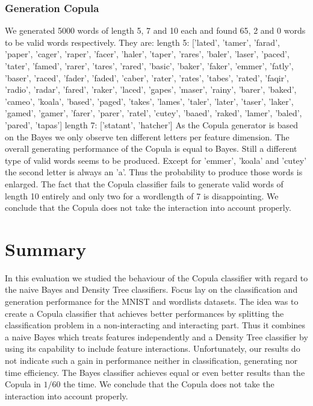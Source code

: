 \documentclass[draft]{article}
\begin{document}
\subsubsection{Generation Copula}
We generated 5000 words of length 5, 7 and 10 each and found 65, 2 and 0 words
to be valid words respectively. They are:
\newline
\newline
length 5: ['lated', 'tamer', 'farad', 'paper', 'cager', 'raper', 'facer', 'haler', 'taper', 'rares', 'baler', 'laser', 'paced', 'tater', 'famed', 'rarer', 'tares', 'rared', 'basic', 'baker', 'faker', 'emmer', 'fatly', 'baser', 'raced', 'fader', 'faded', 'caber', 'rater', 'rates', 'tabes', 'rated', 'faqir', 'radio', 'radar', 'fared', 'raker', 'laced', 'gapes', 'maser', 'rainy', 'barer', 'baked', 'cameo', 'koala', 'based', 'paged', 'takes', 'lames', 'taler', 'later', 'taser', 'laker', 'gamed', 'gamer', 'farer', 'parer', 'ratel', 'cutey', 'baaed', 'raked', 'lamer', 'baled', 'pared', 'tapas']
\newline
\newline
length 7: ['statant', 'hatcher']
\newline
\newline
As the Copula generator is based on the Bayes
we only observe ten different letters per feature dimension.
The overall generating performance of the Copula is equal to Bayes. Still a
different type of valid words seems to be produced.
Except for 'emmer', 'koala' and 'cutey' the second letter is always an 'a'.
Thus the probability to produce those words is enlarged.
The fact that the Copula classifier fails to generate valid words of length 10
entirely and only two for a wordlength of 7 is disappointing.
We conclude that the Copula does not take the interaction into account properly.

\section{Summary}
In this evaluation we studied the behaviour of the Copula classifier with regard
to the naive Bayes and Density Tree classifiers. Focus lay on the
classification and generation performance for the MNIST and wordlists datasets.
The idea was to create a Copula classifier that achieves better performances
by splitting the classification problem in a non-interacting and interacting part.
Thus it combines a naive Bayes which treats features independently
and a Density Tree classifier by using its capability to include feature interactions.
\newline
Unfortunately, our results do not indicate such a gain in performance neither
in classification, generating nor time efficiency.
The Bayes classifier achieves equal or even better results than the Copula in $1/60$
the time.
We conclude that the Copula does not take the interaction into account properly.
\newline
\end{document}
